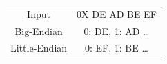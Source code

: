 \documentclass[a4paper]{article} \usepackage[backend=biber, style=numeric, sorting=none]{biblatex}
\begin{document}
\begin{multicols*}{4}
\begin{center}
\vspace{5mm} %
\begin{tabular}{ |c c| } 
 \hline
 Input & 0X DE AD BE EF  \\ 
 Big-Endian & 0: DE, 1: AD \dots  \\ 
 Little-Endian & 0: EF, 1: BE \dots  \\ 
 \hline
\end{tabular}
\end{center}

    \end{multicols*}
\end{document}
